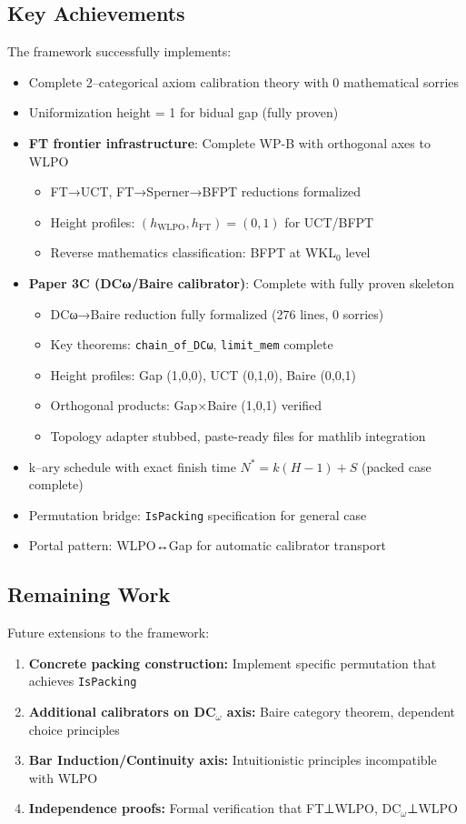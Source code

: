 \documentclass[11pt]{article}
\theoremstyle{definition}
\theoremstyle{remark}
\begin{document}
\subsection{Key Achievements}
The framework successfully implements:
\begin{itemize}
\item Complete 2--categorical axiom calibration theory with 0 mathematical sorries
\item Uniformization height = 1 for bidual gap (fully proven)
\item \textbf{FT frontier infrastructure}: Complete WP-B with orthogonal axes to WLPO
  \begin{itemize}
  \item FT→UCT, FT→Sperner→BFPT reductions formalized
  \item Height profiles: $(h_{\text{WLPO}}, h_{\text{FT}}) = (0, 1)$ for UCT/BFPT
  \item Reverse mathematics classification: BFPT at WKL$_0$ level \cite{Hirst-BFPT}
  \end{itemize}
\item \textbf{Paper 3C (DCω/Baire calibrator)}: Complete with fully proven skeleton
  \begin{itemize}
  \item DCω→Baire reduction fully formalized (276 lines, 0 sorries)
  \item Key theorems: \texttt{chain\_of\_DCω}, \texttt{limit\_mem} complete
  \item Height profiles: Gap (1,0,0), UCT (0,1,0), Baire (0,0,1)
  \item Orthogonal products: Gap×Baire (1,0,1) verified
  \item Topology adapter stubbed, paste-ready files for mathlib integration
  \end{itemize}
\item k--ary schedule with exact finish time $N^* = k(H-1) + S$ (packed case complete)
\item Permutation bridge: \texttt{IsPacking} specification for general case
\item Portal pattern: WLPO↔Gap for automatic calibrator transport
\end{itemize}

\subsection{Remaining Work}
Future extensions to the framework:
\begin{enumerate}
\item \textbf{Concrete packing construction:} Implement specific permutation that achieves \texttt{IsPacking}
\item \textbf{Additional calibrators on DC$_\omega$ axis:} Baire category theorem, dependent choice principles
\item \textbf{Bar Induction/Continuity axis:} Intuitionistic principles incompatible with WLPO
\item \textbf{Independence proofs:} Formal verification that FT⊥WLPO, DC$_\omega$⊥WLPO
\end{enumerate}
\end{document}
